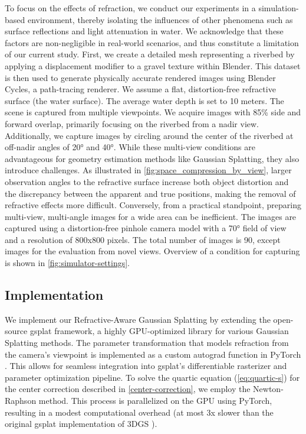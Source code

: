 To focus on the effects of refraction, we conduct our experiments in a simulation-based environment, thereby isolating the influences of other phenomena such as surface reflections and light attenuation in water. 
We acknowledge that these factors are non-negligible in real-world scenarios, and thus constitute a limitation of our current study.
First, we create a detailed mesh representing a riverbed by applying a displacement modifier to a gravel texture within Blender. 
This dataset is then used to generate physically accurate rendered images using Blender Cycles, a path-tracing renderer.
We assume a flat, distortion-free refractive surface (the water surface). 
The average water depth is set to 10 meters.
The scene is captured from multiple viewpoints. 
We acquire images with 85\% side and forward overlap, primarily focusing on the riverbed from a nadir view. 
Additionally, we capture images by circling around the center of the riverbed at off-nadir angles of 20° and 40°. 
While these multi-view conditions are advantageous for geometry estimation methods like Gaussian Splatting, they also introduce challenges. 
As illustrated in \cref{fig:space_compression_by_view}, larger observation angles to the refractive surface increase both object distortion and the discrepancy between the apparent and true positions, making the removal of refractive effects more difficult. 
Conversely, from a practical standpoint, preparing multi-view, multi-angle images for a wide area can be inefficient.
The images are captured using a distortion-free pinhole camera model with a 70° field of view and a resolution of 800x800 pixels. 
The total number of images is 90, except images for the evaluation from novel views.
Overview of a condition for capturing is shown in \cref{fig:simulator-settings}.


\subsection{Implementation}\label{sec:implementation}
We implement our Refractive-Aware Gaussian Splatting by extending the open-source gsplat \parencite{ye2025_gsplat} framework, a highly GPU-optimized library for various Gaussian Splatting methods. 
The parameter transformation that models refraction from the camera's viewpoint is implemented as a custom autograd function in PyTorch \parencite{paszke2019pytorch}. 
This allows for seamless integration into gsplat's differentiable rasterizer and parameter optimization pipeline. 
To solve the quartic equation (\cref{eq:quartic-s}) for the center correction described in \cref{center-correction}, we employ the Newton-Raphson method. 
This process is parallelized on the GPU using PyTorch, resulting in a modest computational overhead (at most 3x slower than the original gsplat implementation of 3DGS \parencite{Kerbl2023ToG_3DGS}).

